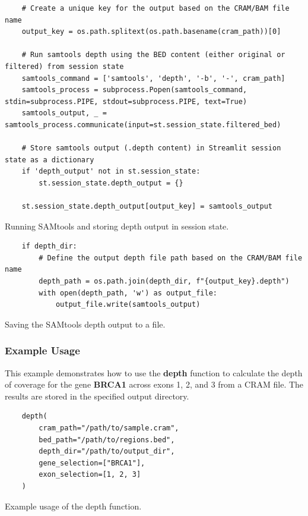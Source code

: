 \begin{longlisting}
\begin{verbatim}
    # Create a unique key for the output based on the CRAM/BAM file name
    output_key = os.path.splitext(os.path.basename(cram_path))[0]

    # Run samtools depth using the BED content (either original or filtered) from session state
    samtools_command = ['samtools', 'depth', '-b', '-', cram_path]
    samtools_process = subprocess.Popen(samtools_command, stdin=subprocess.PIPE, stdout=subprocess.PIPE, text=True)
    samtools_output, _ = samtools_process.communicate(input=st.session_state.filtered_bed)

    # Store samtools output (.depth content) in Streamlit session state as a dictionary
    if 'depth_output' not in st.session_state:
        st.session_state.depth_output = {}

    st.session_state.depth_output[output_key] = samtools_output
\end{verbatim}
\caption{Running SAMtools and storing depth output in session state.}
\label{lbl:samtools4}
\end{longlisting}

\begin{longlisting}
\begin{verbatim}
    if depth_dir:
        # Define the output depth file path based on the CRAM/BAM file name
        depth_path = os.path.join(depth_dir, f"{output_key}.depth")
        with open(depth_path, 'w') as output_file:
            output_file.write(samtools_output)
\end{verbatim}
\caption{Saving the SAMtools depth output to a file.}
\label{lbl:samtools5}
\end{longlisting}

\subsubsection{\textbf{Example Usage}}

This example demonstrates how to use the \textbf{depth} function to calculate the depth of coverage for the gene \textbf{BRCA1} across exons 1, 2, and 3 from a CRAM file. The results are stored in the specified output directory.

\begin{longlisting}
\begin{verbatim}
    depth(
        cram_path="/path/to/sample.cram", 
        bed_path="/path/to/regions.bed", 
        depth_dir="/path/to/output_dir", 
        gene_selection=["BRCA1"], 
        exon_selection=[1, 2, 3]
    )
\end{verbatim}
\caption{Example usage of the depth function.}
\label{lbl:samtools6}
\end{longlisting}

